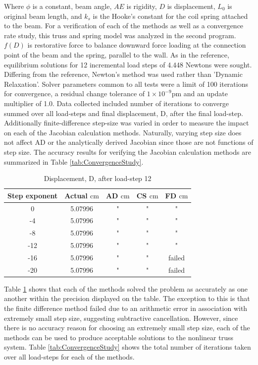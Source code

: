 \documentclass[preprint,12pt]{elsarticle}
\begin{document}
Where $\phi$ is a constant, beam angle, $AE$ is rigidity, $D$ is displacement,
$L_{0}$ is original beam length, and $k_{s}$ is the Hooke's constant for the
coil spring attached to the beam. For a verification of each of the methods as
well as a convergence rate study, this truss and spring model was analyzed in
the second program. $f(D)$ is restorative force to balance downward force
loading at the connection point of the beam and the spring, parallel to the
wall. As in the reference, equilibrium solutions for 12 incremental load steps
of 4.448 Newtons were sought. Differing from the reference, Newton's method was
used rather than 'Dynamic Relaxation'. Solver parameters common to all tests
were a limit of 100 iterations for convergence, a residual change tolerance of
$1\times{10^{-9}} \si{\pico\meter}$ and an update multiplier of 1.0. Data
collected included number of iterations to converge summed over all load-steps
and final displacement, D, after the final load-step. Additionally
finite-difference step-size was varied in order to measure the impact on each
of the Jacobian calculation methods. Naturally, varying step size does not
affect AD or the analytically derived Jacobian since those are not functions
of step size. The accuracy results for
verifying the Jacobian calculation methods are summarized in Table
\ref{tab:ConvergenceStudy}. 

\begin{table}[!ht]    
  \centering
        \caption{Displacement, D, after load-step 12} \label{tab:Verification}   
        \begin{tabular}{c c c c c}
         \toprule
         Step exponent & Actual $\si{\centi\meter}$ & AD $\si{\centi\meter}$ & CS $\si{\centi\meter}$ & FD $\si{\centi\meter}$\\ 
        \midrule
        0 & 5.07996 & " & " & "\\
        -4 & 5.07996 & " & " & "\\
        -8 & 5.07996 & " & " & "\\
        -12 & 5.07996 & " & " & " \\
        -16 & 5.07996 & " & " & failed \\
        -20 & 5.07996 & " & " & failed \\
        \bottomrule
    \end{tabular}
\end{table}

Table \ref{tab:Verification} shows that each of the methods solved the problem
as accurately as one another within the precision displayed on the table. The
exception to this is that the finite difference method failed due to an
arithmetic error in association with extremely small step size, suggesting
subtractive cancellation. However, since there is no accuracy reason for
choosing an extremely small step size, each of the methods can be used to
produce acceptable solutions to the nonlinear truss system. Table
\ref{tab:ConvergenceStudy} shows the total number of iterations taken over all
load-steps for each of the methods. 
\end{document}
